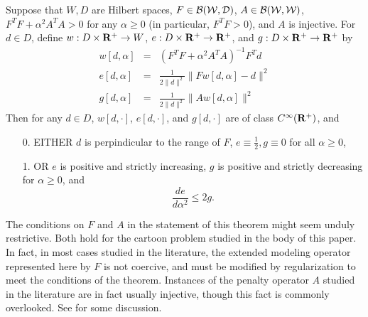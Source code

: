 \begin{theorem}
  \label{thm:tich}
  Suppose that $W, D$ are Hilbert spaces, $F \in \cal{B}(W,D)$, $A \in \cal{B}(W,W)$, $F^TF + \alpha^2 A^TA > 0$ for any $\alpha \ge 0$ (in particular, $F^TF>0$), and $A$ is injective. For $d \in D$, define 
  $w: D \times {\bf R}^+ \rightarrow W$,
  $e: D \times {\bf R}^+ \rightarrow {\bf R}^+$, and $g: D \times {\bf R}^+ \rightarrow {\bf R}^+$ by
  \begin{eqnarray}
    w[d,\alpha] &=& (F^TF + \alpha^2 A^TA)^{-1}F^Td \nonumber \\
    e[d,\alpha] &=& \frac{1}{2\|d\|^2}\|Fw[d,\alpha]-d\|^2 \nonumber \\
    g[d,\alpha] &=& \frac{1}{2\|d\|^2}\|Aw[d,\alpha]\|^2
    \label{eqn:tichdefs}
  \end{eqnarray}
  Then for any $d\in D$, $w[d,\cdot]$, $e[d,\cdot]$, and $g[d,\cdot]$ are of class $ C^{\infty}({\bf R}^+)$, and 
  \begin{itemize}
      \item[0. ] EITHER $d$ is perpindicular to the range of $F$, $e \equiv \frac{1}{2}, g \equiv 0$ for all $\alpha \ge 0$, 
      \item[1. ] OR $e$ is positive and strictly increasing, $g$ is positive and strictly decreasing for  $\alpha\ge 0$, and 
      \begin{equation}
        \label{eqn:lep}
        \frac{de}{d\alpha^2}  \le 2g.
      \end{equation}
  \end{itemize}
\end{theorem}

 The conditions on $F$ and $A$ in the statement of this theorem might seem unduly restrictive. Both hold for the cartoon problem studied in the body of this paper. In fact, in most cases studied in the literature, the extended modeling operator represented here by $F$ is not coercive, and must be modified by regularization to meet the conditions of the theorem. Instances of the penalty operator $A$ studied in the literature are in fact usually injective, though this fact is commonly overlooked. See \cite{Symes:09} for some discussion.

